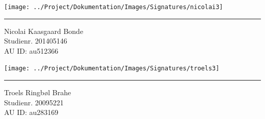 \begin{titlingpage}
\begin{center}
			\begin{minipage}{0.40\linewidth}
				\centering
				\texttt{[image: ../Project/Dokumentation/Images/Signatures/nicolai3]}
				\hrule
				\vspace{12pt}
				Nicolai Kaasgaard Bonde\\
				Studienr. 201405146\\
				AU ID: au512366
			\end{minipage}
			\hspace{50pt}
			\begin{minipage}{0.40\linewidth}
				\centering
				\texttt{[image: ../Project/Dokumentation/Images/Signatures/troels3]}
				\hrule
				\vspace{12pt}
				Troels Ringbøl Brahe\\
				Studienr. 20095221\\
				AU ID: au283169
			\end{minipage}
	\end{center}
\end{titlingpage}